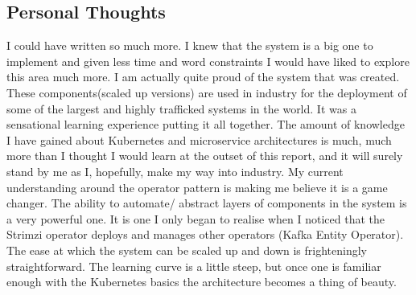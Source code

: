 \begin{flushleft}
	\section{Personal Thoughts}
	I could have written so much more. I knew that the system is a big one to implement and given less time and word constraints I would
	have liked to explore this area much more.\newline
	I am actually quite proud of the system that was created. These components(scaled up versions) are used in industry for the deployment
	of some of the largest and highly trafficked systems in the world. It was a sensational learning experience putting it all together.
	\bigbreak
	The amount of knowledge I have gained about Kubernetes and microservice architectures is much, much more than I thought I would learn at the
	outset of this report, and it will surely stand by me as I, hopefully, make my way into industry.\newline
	My current understanding around the operator pattern is making me believe it is a game changer. The ability to automate/ abstract layers
	of components in the system is a very powerful one. It is one I only began to realise when I noticed that the Strimzi operator deploys
	and manages other operators (Kafka Entity Operator). The ease at which the system can be scaled up and down is frighteningly straightforward.
	The learning curve is a little steep, but once one is familiar enough with the Kubernetes basics the architecture becomes a thing of beauty.


\end{flushleft}
